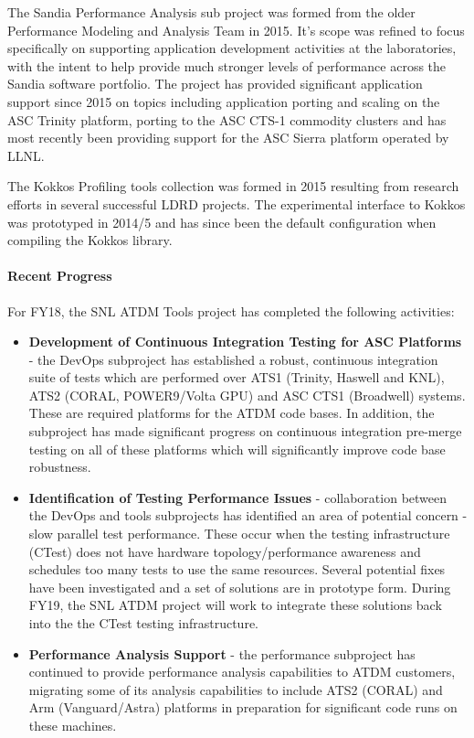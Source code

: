 \noindent
The Sandia Performance Analysis sub project was formed from the older Performance Modeling and Analysis Team in 2015.
It's scope was refined to focus specifically on supporting application development activities at the laboratories, with the intent to help provide much stronger levels of performance across the Sandia software portfolio.
The project has provided significant application support since 2015 on topics including application porting and scaling on the ASC Trinity platform, porting to the ASC CTS-1 commodity clusters and has most recently been providing support for the ASC Sierra platform operated by LLNL.

The Kokkos Profiling tools collection was formed in 2015 resulting from research efforts in several successful LDRD projects.
The experimental interface to Kokkos was prototyped in 2014/5 and has since been the default configuration when compiling the Kokkos library.

\paragraph{Recent Progress}

For FY18, the SNL ATDM Tools project has completed the following activities:

\begin{itemize}
\item {\bf Development of Continuous Integration Testing for ASC Platforms} - the DevOps subproject has established a robust, continuous integration suite of tests which are performed over ATS1 (Trinity, Haswell and KNL), ATS2 (CORAL, POWER9/Volta GPU) and ASC CTS1 (Broadwell) systems. These are required platforms for the ATDM code bases. In addition, the subproject has made significant progress on continuous integration pre-merge testing on all of these platforms which will significantly improve code base robustness.

\item {\bf Identification of Testing Performance Issues} - collaboration between the DevOps and tools subprojects has identified an area of potential concern - slow parallel test performance. These occur when the testing infrastructure (CTest) does not have hardware topology/performance awareness and schedules too many tests to use the same resources. Several potential fixes have been investigated and a set of solutions are in prototype form. During FY19, the SNL ATDM project will work to integrate these solutions back into the the CTest testing infrastructure.

\item {\bf Performance Analysis Support} - the performance subproject has continued to provide performance analysis capabilities to ATDM customers, migrating some of its analysis capabilities to include ATS2 (CORAL) and Arm (Vanguard/Astra) platforms in preparation for significant code runs on these machines.
\end{itemize}

